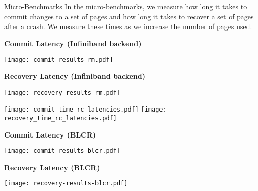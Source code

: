 \begin{block}{Micro-Benchmarks}
    In the micro-benchmarks, we measure how long it takes to commit changes to
    a set of pages and how long it takes to recover a set of pages after a
    crash. We measure these times as we increase the number of pages used.

    \vspace{1em}

    \centering
    \begin{minipage}{0.45\textwidth}
        \centering
        \tiny{\textbf{Commit Latency (Infiniband backend)}}

        \texttt{[image: commit-results-rm.pdf]}
    \end{minipage}
    \begin{minipage}{0.45\textwidth}
        \centering
        \tiny{\textbf{Recovery Latency (Infiniband backend)}}

        \texttt{[image: recovery-results-rm.pdf]}
    \end{minipage}

    \texttt{[image: commit\_time\_rc\_latencies.pdf]}
    \texttt{[image: recovery\_time\_rc\_latencies.pdf]}

    \begin{minipage}{0.45\textwidth}
        \centering
        \tiny{\textbf{Commit Latency (BLCR)}}

        \texttt{[image: commit-results-blcr.pdf]}
    \end{minipage}
    \begin{minipage}{0.45\textwidth}
        \centering
        \tiny{\textbf{Recovery Latency (BLCR)}}

        \texttt{[image: recovery-results-blcr.pdf]}
    \end{minipage}
\end{block}
